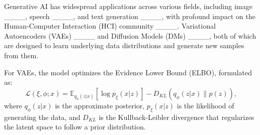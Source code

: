 

Generative AI has widespread applications across various fields, including image ____, speech ____, and text generation ____, with profound impact on the Human-Computer Interaction (HCI) community ____. Variational Autoencoders (VAEs) ____ and Diffusion Models (DMs) ____, both of which are designed to learn underlying data distributions and generate new samples from them. 

For VAEs, the model optimizes the Evidence Lower Bound (ELBO), formulated as:
\begin{equation}
\label{eq:sample}
\mathcal{L}(\xi, \phi; x) = \mathbb{E}_{q_\phi(z|x)}[\log p_\xi(x|z)] - D_{KL}(q_\phi(z|x) \parallel p(z)),
\end{equation}
where \(q_\phi(z|x)\) is the approximate posterior, \(p_\xi(x|z)\) is the likelihood of generating the data, and \(D_{KL}\) is the Kullback-Leibler divergence that regularizes the latent space to follow a prior distribution.

